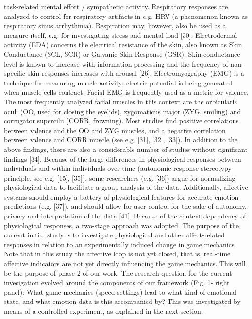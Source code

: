 task-related mental effort / sympathetic activity. Respiratory responses are analyzed to control for respiratory artifacts in e.g. HRV (a phenomenon known as respiratory sinus arrhythmia). Respiration may, however, also be used as a measure itself, e.g. for investigating stress and mental load [30]. Electrodermal activity (EDA) concerns the electrical resistance of the skin, also known as Skin Conductance (SCL, SCR) or Galvanic Skin Response (GSR). Skin conductance level is known to increase with information processing and the frequency of non-specific skin responses increases with arousal [26]. Electromyography (EMG) is a technique for measuring muscle activity; electric potential is being generated when muscle cells contract. Facial EMG is frequently used as a metric for valence. The most frequently analyzed facial muscles in this context are the orbicularis oculi (OO, used for closing the eyelids), zygomaticus major (ZYG, smiling) and corrugator supercilii (CORR, frowning). Most studies find positive correlations between valence and the OO and ZYG muscles, and a negative correlation between valence and CORR muscle (see e.g. [31], [32], [33]). In addition to the above findings, there are also a considerable number of studies without significant findings [34]. Because of the large differences in physiological responses between individuals and within individuals over time (autonomic response stereotypy principle, see e.g. [15], [35]), some researchers (e.g. [36]) argue for normalizing physiological data to facilitate a group analysis of the data. Additionally, affective systems should employ a battery of physiological features for accurate emotion predictions (e.g. [37]), and should allow for user-control for the sake of autonomy, privacy and interpretation of the data [41]. Because of the context-dependency of physiological responses, a two-stage approach was adopted. The purpose of the current initial study is to investigate physiological and other affect-related responses in relation to an experimentally induced change in game mechanics. Note that in this study the affective loop is not yet closed, that is, real-time affective indicators are not yet directly influencing the game mechanics. This will be the purpose of phase 2 of our work. The research question for the current invesigation evolved around the components of our framework (Fig. 1- right panel): What game mechanics (speed settings) lead to what kind of emotional state, and what emotion-data is this accompanied by? This was investigated by means of a controlled experiment, as explained in the next section.


